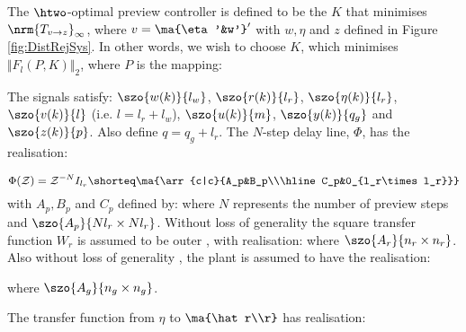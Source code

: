 \label{sec:Sys}
The $\htwo$-optimal preview controller is defined to be the $K$ that minimises $\nrm{T_{v\rightarrow z}}_\infty$, where $v=\ma{\eta'&w'}'$ with $w,\eta$ and $z$ defined in Figure \ref{fig:DistRejSys}. In other words, we wish to choose $K$, which minimises $\Vert F_l(P,K) \Vert_2$, where $P$ is the mapping:

The signals satisfy: $\szo{w(k)}{l_w}$, $\szo{r(k)}{l_r}$, $\szo{\eta(k)}{l_r}$, $\szo{v(k)}{l}$ (i.e. $l=l_r+l_w$), $\szo{u(k)}{m}$, $\szo{y(k)}{q_g}$   and $\szo{z(k)}{p}$.  Also define $q=q_g+l_r$. The  $N$-step delay line, $\Phi$, has the realisation:

\[
\Phi(\z)=\z^{-N}I_{l_r} \shorteq \ma{\arr{c|c}{A_p&B_p\\\hline C_p&0_{l_r\times l_r}}}
\]
with $A_p,B_p$ and $C_p$ defined by:
where $N$ represents the number of preview steps and $\szo{A_p}{Nl_r\times Nl_r}$.
 Without loss of generality the square transfer function $W_r$ is assumed to be outer \cite{LimebeerGreen,ZDG}, with realisation:
where $\szo{A_r}{n_r\times n_r}$. Also without loss of generality \cite{LimebeerGreen}, the plant is assumed to have the realisation:

where $\szo{A_g}{n_g\times n_g}$. 

The transfer function from $\eta$ to $\ma{\hat r\\r} $ has realisation:

